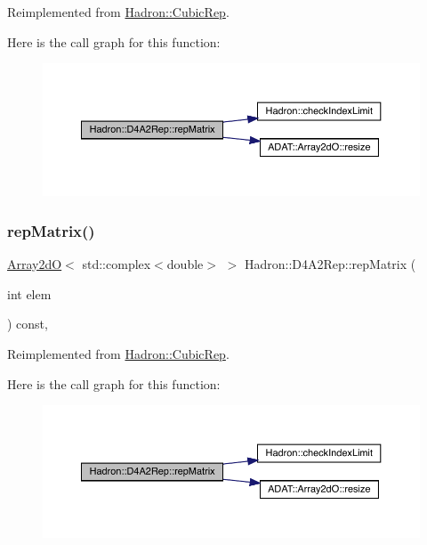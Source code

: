 Reimplemented from \mbox{\hyperlink{structHadron_1_1CubicRep_ac5d7e9e6f4ab1158b5fce3e4ad9e8005}{Hadron\+::\+Cubic\+Rep}}.

Here is the call graph for this function\+:
\nopagebreak
\begin{figure}[H]
\begin{center}
\leavevmode
\includegraphics[width=350pt]{d7/d66/structHadron_1_1D4A2Rep_a278dadc5305417dfc7dd7a8e1ae642d4_cgraph}
\end{center}
\end{figure}
\mbox{\label{structHadron_1_1D4A2Rep_a278dadc5305417dfc7dd7a8e1ae642d4}} 
\subsubsection{\texorpdfstring{repMatrix()}{repMatrix()}\hspace{0.1cm}{\footnotesize\ttfamily [3/3]}}
{\footnotesize\ttfamily \mbox{\hyperlink{classADAT_1_1Array2dO}{Array2dO}}$<$ std\+::complex$<$double$>$ $>$ Hadron\+::\+D4\+A2\+Rep\+::rep\+Matrix (\begin{DoxyParamCaption}\item[{int}]{elem }\end{DoxyParamCaption}) const\hspace{0.3cm}{\ttfamily [inline]}, {\ttfamily [virtual]}}



Reimplemented from \mbox{\hyperlink{structHadron_1_1CubicRep_ac5d7e9e6f4ab1158b5fce3e4ad9e8005}{Hadron\+::\+Cubic\+Rep}}.

Here is the call graph for this function\+:
\nopagebreak
\begin{figure}[H]
\begin{center}
\leavevmode
\includegraphics[width=350pt]{d7/d66/structHadron_1_1D4A2Rep_a278dadc5305417dfc7dd7a8e1ae642d4_cgraph}
\end{center}
\end{figure}


